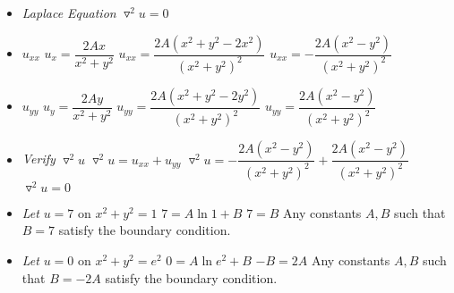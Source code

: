 \documentclass[10pt]{article}
\begin{document}
\begin{itemize}
    \item \textit{Laplace Equation} $ \triangledown^2u = 0 $
    \item  $ u_{xx} $
    \subitem $ \displaystyle u_{x} = \dfrac{2 A x}{x^2+y^2} $
    \subitem $ \displaystyle u_{xx} = \dfrac{2 A \left(x^2+y^2-2x^2\right)}{\left(x^2+y^2\right)^2} $
    \subitem $ \displaystyle u_{xx} = -\dfrac{2 A \left(x^2-y^2\right)}{\left(x^2+y^2\right)^2} $
    \item  $ u_{yy} $
    \subitem $ \displaystyle u_{y} = \dfrac{2 A y}{x^2+y^2} $
    \subitem $ \displaystyle u_{yy} = \dfrac{2 A \left(x^2+y^2-2y^2\right)}{\left(x^2+y^2\right)^2} $
    \subitem $ \displaystyle u_{yy} = \dfrac{2 A \left(x^2-y^2\right)}{\left(x^2+y^2\right)^2} $
    \item \textit{Verify} $ \triangledown^2u $
    \subitem $ \triangledown^2u = u_{xx} + u_{yy} $
    \subitem $ \displaystyle \triangledown^2u =-\dfrac{2 A \left(x^2-y^2\right)}{\left(x^2+y^2\right)^2} + \dfrac{2 A \left(x^2-y^2\right)}{\left(x^2+y^2\right)^2} $
    \subitem  $ \triangledown^2u = 0 $
    \item \textit{Let} $ u = 7 $ on $ x^2 + y^2 = 1 $
    \subitem $ 7 = A\ln{1} + B $
    \subitem $ 7 = B $
    \subitem Any constants $ A,B $ such that $ B=7 $ satisfy the boundary condition. 
    \item \textit{Let} $ u = 0 $ on $ x^2 + y^2 = e^2 $
    \subitem $ 0 = A\ln{e^2} + B $
    \subitem $ -B = 2A $
    \subitem Any constants $ A,B $ such that $ B=-2A $ satisfy the boundary condition. 
\end{itemize}

\newpage
\end{document}
